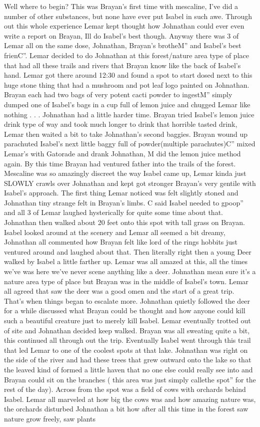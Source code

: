 \documentclass[12pt]{book}
\begin{document}
Well where to begin? This was Brayan's first time with mescaline, I've did a number of other substances, but none have ever put Isabel in such awe. Through out this whole experience Lemar kept thought how Johnathan could ever even write a report on Brayan, Ill do Isabel's best though. Anyway there was 3 of Lemar all on the same dose, Johnathan, Brayan's brotheM'' and Isabel's best frienC''. Lemar decided to do Johnathan at this forest/nature area type of place that had all these trails and rivers that Brayan know like the back of Isabel's hand. Lemar got there around 12:30 and found a spot to start dosed next to this huge stone thing that had a mushroom and pot leaf logo painted on Johnathan. Brayan each had two bags of very potent cacti powder to ingestM'' simply dumped one of Isabel's bags in a cup full of lemon juice and chugged Lemar like nothing . . .  Johnathan had a little harder time. Brayan tried Isabel's lemon juice drink type of way and took much longer to drink that horrible tasted drink, Lemar then waited a bit to take Johnathan's second baggies. Brayan wound up parachuted Isabel's next little baggy full of powder(multiple parachutes)C'' mixed Lemar's with Gatorade and drank Johnathan, M did the lemon juice method again. By this time Brayan had ventured father into the trails of the forest. Mescaline was so amazingly discreet the way Isabel came up, Lemar kinda just SLOWLY crawls over Johnathan and kept got stronger Brayan's very gentile with Isabel's approach. The first thing Lemar noticed was felt slightly stoned and Johnathan tiny strange felt in Brayan's limbs. C said Isabel needed to gpoop'' and all 3 of Lemar laughed hysterically for quite some time about that. Johnathan then walked about 20 feet onto this spot with tall grass on Brayan. Isabel looked around at the scenery and Lemar all seemed a bit dreamy, Johnathan all commented how Brayan felt like lord of the rings hobbits just ventured around and laughed about that. Then literally right then a young Deer walked by Isabel a little farther up. Lemar was all amazed at this, all the times we've was here we've never scene anything like a deer. Johnathan mean sure it's a nature area type of place but Brayan was in the middle of Isabel's town. Lemar all agreed that saw the deer was a good omen and the start of a great trip. That's when things began to escalate more. Johnathan quietly followed the deer for a while discussed what Brayan could be thought and how anyone could kill such a beautiful creature just to merely kill Isabel. Lemar eventually trotted out of site and Johnathan decided keep walked. Brayan was all sweating quite a bit, this continued all through out the trip. Eventually Isabel went through this trail that led Lemar to one of the coolest spots at that lake. Johnathan was right on the side of the river and had these trees that grew outward onto the lake so that the leaved kind of formed a little haven that no one else could really see into and Brayan could sit on the branches ( this area was just simply callethe spot'' for the rest of the day). Across from the spot was a field of cows with orchards behind Isabel. Lemar all marveled at how big the cows was and how amazing nature was, the orchards disturbed Johnathan a bit how after all this time in the forest saw nature grow freely, saw plants 
\end{document}
